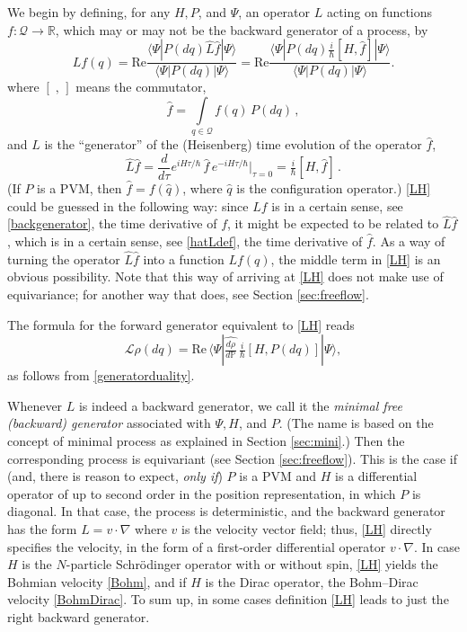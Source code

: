 \documentclass[12pt]{article}
\newcommand{\RRR}{\mathbb{R}} %
\newcommand{\E}{e} %
\newcommand{\I}{i} %
\newcommand{\1}{\mathbf{1}} %
\renewcommand{\Re}{\mathrm{Re}} %
\renewcommand{\sp}[2]{\langle #1 | #2 \rangle} %
\newcommand{\conf}{\mathcal{Q}} %
\newcommand{\measure}{\mathbb{P}} %
\newcommand{\generator}{\mathscr{L}} %
\newcommand{\pov}{{P}}%
\begin{document}
We begin by defining, for any $H,\pov$, and $\Psi$, an operator
$L$ acting on functions $f:\conf \to \RRR$, which may or may
not be the backward generator of a process, by
\begin{equation}\label{LH}
   Lf(q) = \Re \frac{\sp{\Psi} {\pov(dq) \hat{L} \hat{f} |\Psi}}
   {\sp{\Psi} {\pov(dq)|\Psi}} = \Re \frac{\sp{\Psi} {\pov(dq)
   \frac{\I}{\hbar} [H,\hat{f}] |\Psi}} {\sp{\Psi} {\pov(dq) |\Psi}}.
\end{equation}
where $[\;,\,]$ means the commutator,
\begin{equation}\label{hatf}
   \hat{f} = \int\limits_{q \in \conf} f(q) \, \pov(dq)\,,
\end{equation}
and $\hat{L}$ is the ``generator'' of the (Heisenberg) time evolution of
the operator $\hat{f}$,
\begin{equation}\label{hatLdef}
   \hat{L}\hat{f} = \frac{d}{d\tau} \E^{\I H \tau/\hbar} \, \hat{f} \,
   \E^{-\I H \tau/\hbar} \Big|_{\tau =0} = \tfrac{\I}{\hbar}
   [H,\hat{f}] \,.
\end{equation}
(If $\pov$ is a PVM, then $\hat{f} = f(\hat{q})$, where $\hat{q}$ is
the configuration operator.)  \eqref{LH} could be guessed in the
following way: since $Lf$ is in a certain sense, see
\eqref{backgenerator}, the time derivative of $f$, it might be
expected to be related to $\hat{L} \hat{f}$, which is in a certain
sense, see \eqref{hatLdef}, the time derivative of $\hat{f}$.  As a
way of turning the operator $\hat{L} \hat{f}$ into a function $Lf(q)$,
the middle term in \eqref{LH} is an obvious possibility.  Note that
this way of arriving at \eqref{LH} does not make use of equivariance;
for another way that does, see Section \ref{sec:freeflow}.

The formula for the forward generator equivalent to \eqref{LH} reads
\begin{equation}\label{genH}
   \generator \rho(dq) = \Re \, \sp{\Psi}{\widehat{\tfrac{d\rho}
   {d\measure}}\, \tfrac{\I}{\hbar} [H, \pov (dq)] |\Psi},
\end{equation}
as follows from \eqref{generatorduality}.

Whenever $L$ is indeed a backward generator, we call it the
\emph{minimal free (backward) generator} associated with $\Psi, H$,
and $\pov$. (The name is based on the concept of minimal process as
explained in Section \ref{sec:mini}.) Then the corresponding process
is equivariant (see Section \ref{sec:freeflow}).  This is the case if
(and, there is reason to expect, \emph{only if}) $\pov$ is a PVM and
$H$ is a differential operator of up to second order in the position
representation, in which $\pov$ is diagonal.  In that case, the
process is deterministic, and the backward generator has the form $L =
v \cdot \nabla$ where $v$ is the velocity vector field; thus,
\eqref{LH} directly specifies the velocity, in the form of a
first-order differential operator $v \cdot \nabla$.  In case $H$ is
the $N$-particle Schr\"odinger operator with or without spin,
\eqref{LH} yields the Bohmian velocity \eqref{Bohm}, and if $H$ is the
Dirac operator, the Bohm--Dirac velocity \eqref{BohmDirac}.  To sum
up, in some cases definition \eqref{LH} leads to just the right
backward generator.
\end{document}
